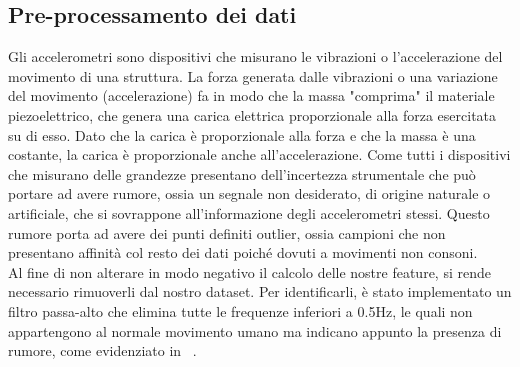 \subsection{Pre-processamento dei dati}
Gli accelerometri sono dispositivi che misurano le vibrazioni o l'accelerazione del movimento di una struttura. La forza generata dalle vibrazioni o una variazione del movimento (accelerazione) fa in modo che la massa "comprima" il materiale piezoelettrico, che genera una carica elettrica proporzionale alla forza esercitata su di esso. Dato che la carica è proporzionale alla forza e che la massa è una costante, la carica è proporzionale anche all'accelerazione. Come tutti i dispositivi che misurano delle grandezze presentano dell'incertezza strumentale che può portare ad avere rumore, ossia un segnale non desiderato, di origine naturale o artificiale, che si sovrappone all'informazione degli accelerometri stessi. Questo rumore porta ad avere dei punti definiti outlier, ossia campioni che non presentano affinità col resto dei dati poiché dovuti a movimenti non consoni.\\
Al fine di non alterare in modo negativo il calcolo delle nostre feature, si rende necessario rimuoverli dal nostro dataset. Per identificarli, è stato implementato un filtro passa-alto che elimina tutte le frequenze inferiori a 0.5Hz, le quali non appartengono al normale movimento umano ma indicano appunto la presenza di rumore, come evidenziato in ~\cite{21}.
